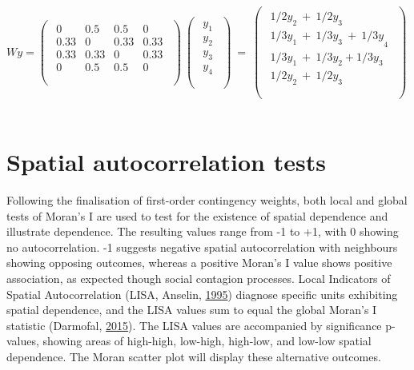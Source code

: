 \documentclass[12pt,twoside]{reedthesis}
\begin{document}
\(Wy=\left(\begin{matrix}\begin{matrix}0&0.5&0.5&0\\0.33&0&0.33&0.33\\0.33&0.33&0&0.33\\0&0.5&0.5&0\\\end{matrix}\\\end{matrix}\right)\ \left(\begin{matrix}\begin{matrix}y_1\\y_2\\y_3\\y_4\\\end{matrix}\\\end{matrix}\right)\ =\ \left(\begin{matrix}\begin{matrix}{1/2y}_2\ +\ {1/2y}_3\\{1/3y}_1\ +\ {{1/3y}_3\ +\ 1/3y}_4\\{1/3y}_1\ +\ {1/3y}_2+{1/3y}_3\\{1/2y}_2\ +\ {1/2y}_3\\\end{matrix}\\\end{matrix}\right)\ \)
~

\hypertarget{spatial-autocorrelation-tests}{%
\section{Spatial autocorrelation tests}\label{spatial-autocorrelation-tests}}

Following the finalisation of first-order contingency weights, both local and global tests of Moran's I are used to test for the existence of spatial dependence and illustrate dependence. The resulting values range from -1 to +1, with 0 showing no autocorrelation. -1 suggests negative spatial autocorrelation with neighbours showing opposing outcomes, whereas a positive Moran's I value shows positive association, as expected though social contagion processes. Local Indicators of Spatial Autocorrelation (LISA, Anselin, \protect\hyperlink{ref-anselin1995}{1995}) diagnose specific units exhibiting spatial dependence, and the LISA values sum to equal the global Moran's I statistic (Darmofal, \protect\hyperlink{ref-darmofal2015}{2015}). The LISA values are accompanied by significance p-values, showing areas of high-high, low-high, high-low, and low-low spatial dependence. The Moran scatter plot will display these alternative outcomes.
\end{document}
